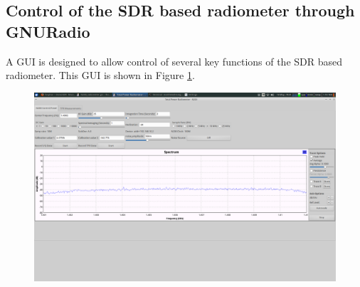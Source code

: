 \subsection{Control of the SDR based radiometer through GNURadio}


A GUI is designed to allow control of several key functions of the SDR based radiometer.  This GUI is shown in Figure \ref{radiometer_gui}. 

{\begin{figure}[h!tb] 
\centering
\includegraphics[width=17cm]{Images/radiometer_gui.png}
\label{radiometer_gui}
\end{figure}
}

